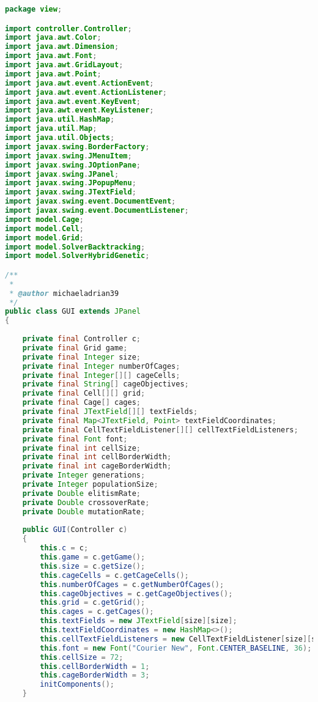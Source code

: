 \begin{lstlisting}[language=Java,basicstyle=\tiny,caption=GUI.java]
package view;

import controller.Controller;
import java.awt.Color;
import java.awt.Dimension;
import java.awt.Font;
import java.awt.GridLayout;
import java.awt.Point;
import java.awt.event.ActionEvent;
import java.awt.event.ActionListener;
import java.awt.event.KeyEvent;
import java.awt.event.KeyListener;
import java.util.HashMap;
import java.util.Map;
import java.util.Objects;
import javax.swing.BorderFactory;
import javax.swing.JMenuItem;
import javax.swing.JOptionPane;
import javax.swing.JPanel;
import javax.swing.JPopupMenu;
import javax.swing.JTextField;
import javax.swing.event.DocumentEvent;
import javax.swing.event.DocumentListener;
import model.Cage;
import model.Cell;
import model.Grid;
import model.SolverBacktracking;
import model.SolverHybridGenetic;

/**
 *
 * @author michaeladrian39
 */
public class GUI extends JPanel
{
    
    private final Controller c;
    private final Grid game;
    private final Integer size;
    private final Integer numberOfCages;
    private final Integer[][] cageCells;
    private final String[] cageObjectives;
    private final Cell[][] grid;
    private final Cage[] cages;
    private final JTextField[][] textFields;
    private final Map<JTextField, Point> textFieldCoordinates;
    private final CellTextFieldListener[][] cellTextFieldListeners;
    private final Font font;
    private final int cellSize;
    private final int cellBorderWidth;
    private final int cageBorderWidth;
    private Integer generations;
    private Integer populationSize;
    private Double elitismRate;
    private Double crossoverRate;
    private Double mutationRate;
    
    public GUI(Controller c)
    {
        this.c = c;
        this.game = c.getGame();
        this.size = c.getSize();
        this.cageCells = c.getCageCells();
        this.numberOfCages = c.getNumberOfCages();
        this.cageObjectives = c.getCageObjectives();
        this.grid = c.getGrid();
        this.cages = c.getCages();
        this.textFields = new JTextField[size][size];
        this.textFieldCoordinates = new HashMap<>();
        this.cellTextFieldListeners = new CellTextFieldListener[size][size];
        this.font = new Font("Courier New", Font.CENTER_BASELINE, 36);
        this.cellSize = 72;
        this.cellBorderWidth = 1;
        this.cageBorderWidth = 3;
        initComponents();
    }
    

\end{lstlisting}
